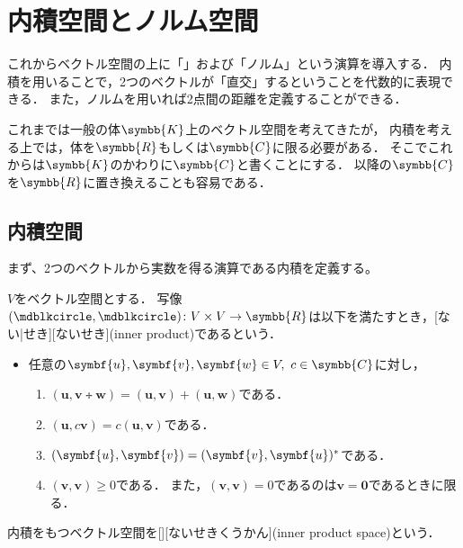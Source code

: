 \documentclass[../sotsu.tex]{subfiles}
\begin{document}
\section{内積空間とノルム空間}

これからベクトル空間の上に「」および「ノルム」という演算を導入する．
内積を用いることで，2つのベクトルが「直交」するということを代数的に表現できる．
また，ノルムを用いれば2点間の距離を定義することができる．

これまでは一般の体$\symbb{K}$上のベクトル空間を考えてきたが，
内積を考える上では，体を$\symbb{R}$もしくは$\symbb{C}$に限る必要がある．
そこでこれからは$\symbb{K}$のかわりに$\symbb{C}$と書くことにする．
以降の$\symbb{C}$を$\symbb{R}$に置き換えることも容易である．


\subsection{内積空間}
\label{sec:inner-product-space}

まず、2つのベクトルから実数を得る演算である内積を定義する。

\begin{definition}[内積]
    \label{dfn:inner-product}
    $V$をベクトル空間とする．
    写像$({\bigdot}, {\bigdot}) \colon V \times V \to \symbb{R}$は以下を満たすとき，[ない|せき][ないせき](inner product)であるという．
    \begin{itemize}
        \item 任意の$\symbf{u}, \symbf{v}, \symbf{w} \in V, \  c \in \symbb{C}$に対し，
        \begin{enumerate}
            \item \label{innerp:sum} $(\symbf{u}, \symbf{v} \tplus \symbf{w}) = (\symbf{u}, \symbf{v}) + (\symbf{u}, \symbf{w})$である．
            \item \label{innerp:scalar} $(\symbf{u}, c\symbf{v}) = c(\symbf{u}, \symbf{v})$である．
            \item \label{innerp:conjugate-symmetry} $(\symbf{u}, \symbf{v}) = \conj{(\symbf{v}, \symbf{u})}$である．
            \item \label{innerp:positive-definiteness}$(\symbf{v}, \symbf{v}) \geq 0$である．
                また，$(\symbf{v}, \symbf{v}) = 0$であるのは$\symbf{v} = \symbf{0}$であるときに限る．
        \end{enumerate}
    \end{itemize}
    内積をもつベクトル空間を[][ないせきくうかん](inner product space)という．
\end{definition}
\end{document}
